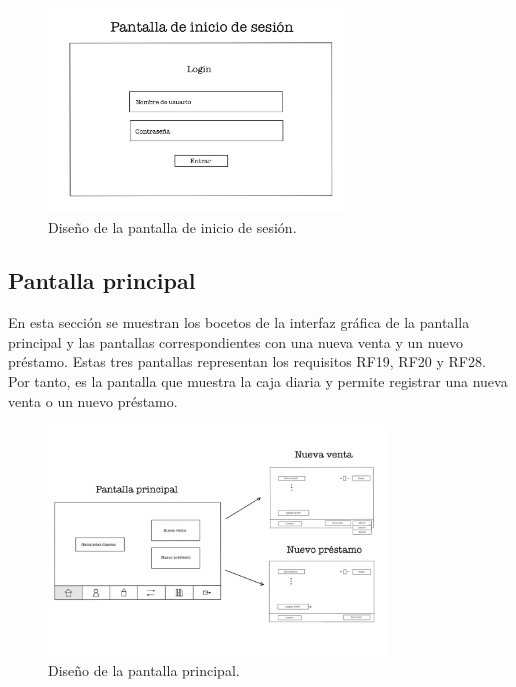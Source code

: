 \begin{figure}[ht]
	\centering
	\includegraphics[width=0.7\textwidth, angle=270]{imagenes/inicio_sesion.JPG}
	\caption{Diseño de la pantalla de inicio de sesión.}
	\label{fig:iniciosesion}
\end{figure}

\newpage

\subsection{Pantalla principal}

En esta sección se muestran los bocetos de la interfaz gráfica de la pantalla principal y las pantallas correspondientes con una nueva venta y un nuevo préstamo. Estas tres pantallas representan los requisitos RF19, RF20 y RF28. Por tanto, es la pantalla que muestra la caja diaria y permite registrar una nueva venta o un nuevo préstamo. 

\begin{figure}[ht]
	\centering
	\includegraphics[width=0.8\textwidth, angle=270]{imagenes/pantalla_principal.JPG}
	\caption{Diseño de la pantalla principal.}
	\label{fig:pantallaprincipal}
\end{figure}

